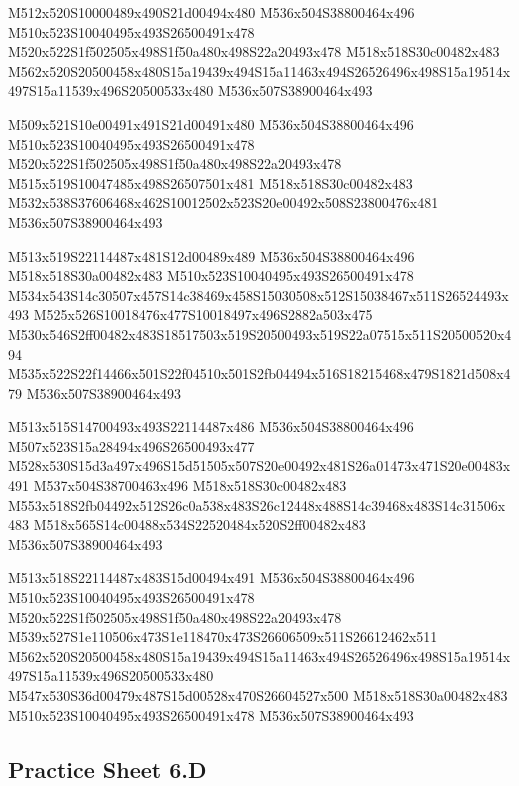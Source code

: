\documentclass{article}
\begin{document}
\begin{multicols}{5}
\begin{center}

M512x520S10000489x490S21d00494x480 %
M536x504S38800464x496 %
M510x523S10040495x493S26500491x478 %
M520x522S1f502505x498S1f50a480x498S22a20493x478 %
M518x518S30c00482x483 %
M562x520S20500458x480S15a19439x494S15a11463x494S26526496x498S15a19514x497S15a11539x496S20500533x480 %
M536x507S38900464x493 %
\vfil
\columnbreak

M509x521S10e00491x491S21d00491x480 %
M536x504S38800464x496 %
M510x523S10040495x493S26500491x478 %
M520x522S1f502505x498S1f50a480x498S22a20493x478 %
M515x519S10047485x498S26507501x481 %
M518x518S30c00482x483 %
M532x538S37606468x462S10012502x523S20e00492x508S23800476x481 %
M536x507S38900464x493 %
\vfil
\columnbreak

M513x519S22114487x481S12d00489x489 %
M536x504S38800464x496 %
M518x518S30a00482x483 %
M510x523S10040495x493S26500491x478 %
M534x543S14c30507x457S14c38469x458S15030508x512S15038467x511S26524493x493 %
M525x526S10018476x477S10018497x496S2882a503x475 %
M530x546S2ff00482x483S18517503x519S20500493x519S22a07515x511S20500520x494 %
M535x522S22f14466x501S22f04510x501S2fb04494x516S18215468x479S1821d508x479 %
M536x507S38900464x493 %
\vfil
\columnbreak

M513x515S14700493x493S22114487x486 %
M536x504S38800464x496 %
M507x523S15a28494x496S26500493x477 %
M528x530S15d3a497x496S15d51505x507S20e00492x481S26a01473x471S20e00483x491 %
M537x504S38700463x496 %
M518x518S30c00482x483 %
M553x518S2fb04492x512S26c0a538x483S26c12448x488S14c39468x483S14c31506x483 %
M518x565S14c00488x534S22520484x520S2ff00482x483 %
M536x507S38900464x493 %
\vfil
\columnbreak

M513x518S22114487x483S15d00494x491 %
M536x504S38800464x496 %
M510x523S10040495x493S26500491x478 %
M520x522S1f502505x498S1f50a480x498S22a20493x478 %
M539x527S1e110506x473S1e118470x473S26606509x511S26612462x511 %
M562x520S20500458x480S15a19439x494S15a11463x494S26526496x498S15a19514x497S15a11539x496S20500533x480 %
M547x530S36d00479x487S15d00528x470S26604527x500 %
M518x518S30a00482x483 %
M510x523S10040495x493S26500491x478 %
M536x507S38900464x493 %
\vfil

\end{center}
\end{multicols}

\subsection{Practice Sheet 6.D}
\end{document}
